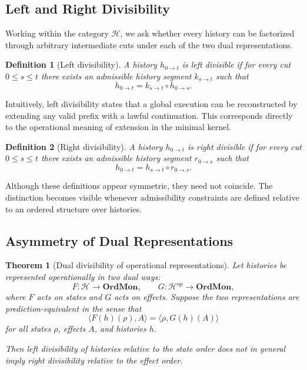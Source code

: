 \documentclass[12pt]{article}
\newtheorem{definition}{Definition}
\newtheorem{theorem}{Theorem}
\begin{document}
\subsection{Left and Right Divisibility}

Working within the category $\mathcal{H}$, we ask whether every history can be factorized
through arbitrary intermediate cuts under each of the two dual representations.

\begin{definition}[Left divisibility]
A history $h_{0 \to t}$ is \emph{left divisible} if for every cut $0 \leq s \leq t$ there
exists an admissible history segment $k_{s \to t}$ such that
\[
h_{0 \to t} = k_{s \to t} \circ h_{0 \to s}.
\]
\end{definition}

Intuitively, left divisibility states that a global execution can be reconstructed by extending
any valid prefix with a lawful continuation. This corresponds directly to the operational
meaning of extension in the minimal kernel.

\begin{definition}[Right divisibility]
A history $h_{0 \to t}$ is \emph{right divisible} if for every cut $0 \leq s \leq t$ there
exists an admissible history segment $r_{0 \to s}$ such that
\[
h_{0 \to t} = h_{s \to t} \circ r_{0 \to s}.
\]
\end{definition}

Although these definitions appear symmetric, they need not coincide. The distinction becomes
visible whenever admissibility constraints are defined relative to an ordered structure over
histories.

\subsection{Asymmetry of Dual Representations}

\begin{theorem}[Dual divisibility of operational representations]
Let histories be represented operationally in two dual ways:
\[
F : \mathcal{H} \to \mathbf{OrdMon}, \qquad
G : \mathcal{H}^{op} \to \mathbf{OrdMon},
\]
where $F$ acts on states and $G$ acts on effects. Suppose the two representations are
prediction-equivalent in the sense that
\[
\langle F(h)(\rho), A \rangle = \langle \rho, G(h)(A) \rangle
\]
for all states $\rho$, effects $A$, and histories $h$.

Then left divisibility of histories relative to the state order does not in general imply
right divisibility relative to the effect order.
\end{theorem}
\end{document}
